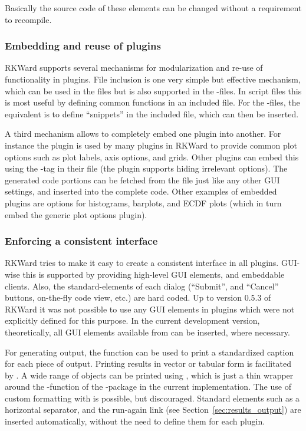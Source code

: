 Basically the source code of these elements can be changed without a requirement to recompile.

\subsubsection{Embedding and reuse of plugins}
\label{sec:technical_plugins_embedding}
RKWard supports several mechanisms for modularization and re-use of
functionality in plugins. File inclusion is one very simple but effective
mechanism, which can be used in the  files but is also supported in
the -files. In script files this is most useful by defining common functions
in an included file. For the -files, the equivalent is to define ``snippets''
in the included file, which can then be inserted.

A third mechanism allows to completely embed one plugin into another. For
instance the  plugin is used by many plugins in RKWard to provide
common plot options such as plot labels, axis options, and grids. Other plugins
can embed this using the -tag in their  file (the plugin supports
hiding irrelevant options). The generated code portions can be fetched from the
 file just like any other GUI settings, and inserted into the complete
code. Other examples of embedded plugins are options for histograms, barplots,
and ECDF plots (which in turn embed the generic plot options plugin).

\subsubsection{Enforcing a consistent interface}
\label{sec:technical_plugins_consistency}
RKWard tries to make it easy to create a consistent interface in all plugins.
GUI-wise this is supported by providing high-level GUI elements, and embeddable
clients. Also, the standard-elements of each dialog (``Submit'', and
``Cancel'' buttons, on-the-fly code view, etc.) are hard coded. Up to version
0.5.3 of RKWard it was not possible to use any GUI elements in plugins which
were not explicitly defined for this purpose. In the current development
version, theoretically, all GUI elements available from  can be inserted,
where necessary.

For generating output, the function  can be used to print a
standardized caption for each piece of output. Printing results in vector or
tabular form is facilitated by . A wide range of objects can be
printed using , which is just a thin wrapper around the
-function of the -package \citep{Lecoutre2003} in the current
implementation. The use of custom formatting with  is possible, but
discouraged. Standard elements such as a horizontal separator, and the run-again
link (see Section~\ref{sec:results_output}) are inserted automatically, without the need to define
them for each plugin.

